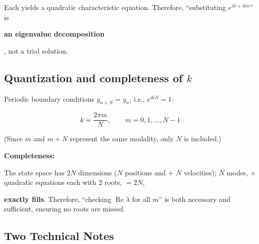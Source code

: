 \documentclass[11pt,a4paper,openany]{book}
\numberwithin{equation}{chapter}
\numberwithin{figure}{chapter}
\numberwithin{table}{chapter}
\begin{document}
Each yields a quadratic characteristic equation. Therefore, “substituting $e^{\lambda t+ikn}$” is




\textbf{an eigenvalue decomposition}




, not a trial solution.










\subsection{Quantization and completeness of $k$}










Periodic boundary conditions $y_{n+N}=y_n$, i.e., $e^{ikN}=1$:

\begin{equation}
k = \frac{2\pi m}{N},\qquad m=0,1,\dots,N-1
\end{equation}

(Since $m$ and $m+N$ represent the same modality, only $N$ is included.)










\textbf{Completeness:}




The state space has $2N$ dimensions ($N$ positions and $+$ $N$ velocities); $N$ modes, $\times$ quadratic equations each with $2$ roots, $=2N$,




\textbf{exactly fills}. Therefore, “checking $\operatorname{Re}\lambda$ for all $m$” is both necessary and sufficient, ensuring no roots are missed.










\subsection{Two Technical Notes}
\end{document}
